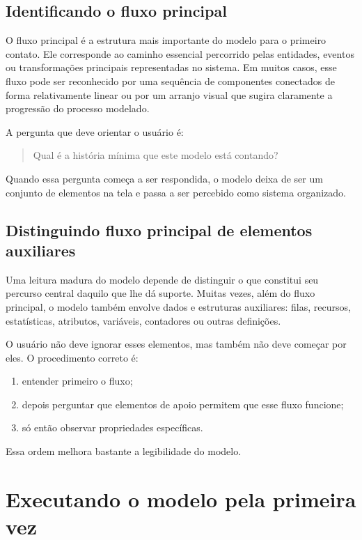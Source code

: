 \subsection{Identificando o fluxo principal}
\label{subsec:cap4_identificando_fluxo_principal}

O fluxo principal é a estrutura mais importante do modelo para o primeiro contato. Ele corresponde ao caminho essencial percorrido pelas entidades, eventos ou transformações principais representadas no sistema. Em muitos casos, esse fluxo pode ser reconhecido por uma sequência de componentes conectados de forma relativamente linear ou por um arranjo visual que sugira claramente a progressão do processo modelado.

A pergunta que deve orientar o usuário é:
\begin{quote}
    Qual é a história mínima que este modelo está contando?
\end{quote}

Quando essa pergunta começa a ser respondida, o modelo deixa de ser um conjunto de elementos na tela e passa a ser percebido como sistema organizado.

\subsection{Distinguindo fluxo principal de elementos auxiliares}
\label{subsec:cap4_fluxo_principal_elementos_auxiliares}

Uma leitura madura do modelo depende de distinguir o que constitui seu percurso central daquilo que lhe dá suporte. Muitas vezes, além do fluxo principal, o modelo também envolve dados e estruturas auxiliares: filas, recursos, estatísticas, atributos, variáveis, contadores ou outras definições.

O usuário não deve ignorar esses elementos, mas também não deve começar por eles. O procedimento correto é:
\begin{enumerate}
    \item entender primeiro o fluxo;
    \item depois perguntar que elementos de apoio permitem que esse fluxo funcione;
    \item só então observar propriedades específicas.
\end{enumerate}

Essa ordem melhora bastante a legibilidade do modelo.

\section{Executando o modelo pela primeira vez}
\label{sec:cap4_executando_modelo_primeira_vez}

